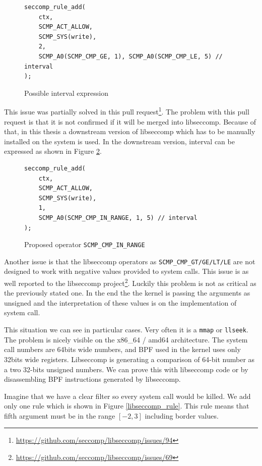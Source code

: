 \begin{figure}[h]
	\label{libseccomp_native}
	\lstset{style=c++}
	\begin{lstlisting}
seccomp_rule_add(
	ctx,
	SCMP_ACT_ALLOW,
	SCMP_SYS(write),
	2,
	SCMP_A0(SCMP_CMP_GE, 1), SCMP_A0(SCMP_CMP_LE, 5) // interval
);
	\end{lstlisting}
	\caption{Possible interval expression}
\end{figure}

This issue was partially solved in this pull
request\footnote{\url{https://github.com/seccomp/libseccomp/issues/94}}. The
problem with this pull request is that it is not confirmed if it will be merged
into libseccomp. Because of that, in this thesis a downstream version of
libseccomp which has to be manually installed on the system is used. In the downstream
version, interval can be expressed as shown in Figure \ref{libseccomp_in_range}.

\begin{figure}[h]
	\label{libseccomp_in_range}
	\lstset{style=c++}
	\begin{lstlisting}
seccomp_rule_add(
	ctx,
	SCMP_ACT_ALLOW,
	SCMP_SYS(write),
	1,
	SCMP_A0(SCMP_CMP_IN_RANGE, 1, 5) // interval
);
	\end{lstlisting}
	\caption{Proposed operator \texttt{SCMP\_CMP\_IN\_RANGE}}
\end{figure}

Another issue is that the libseccomp operators as
\texttt{SCMP\_CMP\_GT/GE/LT/LE} are not designed to work with negative values
provided to system calls. This issue is as well reported to the libseccomp
project\footnote{\url{https://github.com/seccomp/libseccomp/issues/69}}. Luckily
this problem is not as critical as the previously stated one. In the end the
the kernel is passing the arguments as unsigned and the interpretation of these values
is on the implementation of system call.

This situation we can see in particular cases. Very often it is a \texttt{mmap}
or \texttt{llseek}. The problem is nicely visible on the x86\_64 / amd64 architecture. The system call
numbers are 64bits wide numbers, and BPF used in the kernel uses only 32bits
wide registers. Libseccomp is generating a comparison of 64-bit number as a two
32-bits unsigned numbers. We can prove this with libseccomp code or by
disassembling BPF instructions generated by libseccomp.

Imagine that we have a clear filter so every system call would be killed. We add
only one rule which is shown in Figure \ref{libseccomp_rule}. This rule means
that fifth argument must be in the range $[-2, 3]$ including border values.

